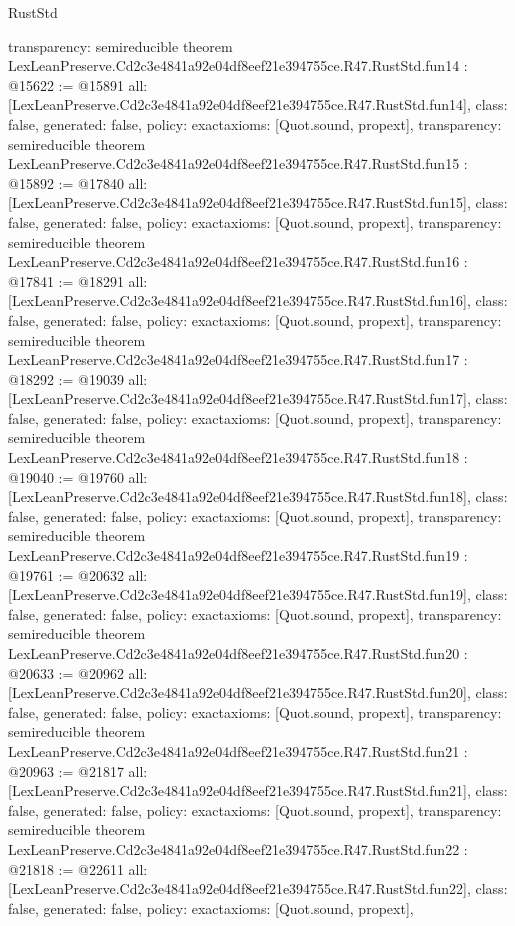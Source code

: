 \begin{lexlean}{RustStd}
\begin{coremodule}
{  transparency: semireducible
}
theorem LexLeanPreserve.Cd2c3e4841a92e04df8eef21e394755ce.R47.RustStd.fun14 : @15622 := @15891 {
  all: [LexLeanPreserve.Cd2c3e4841a92e04df8eef21e394755ce.R47.RustStd.fun14],
  class: false,
  generated: false,
  policy: exact{axioms: [Quot.sound, propext]},
  transparency: semireducible
}
theorem LexLeanPreserve.Cd2c3e4841a92e04df8eef21e394755ce.R47.RustStd.fun15 : @15892 := @17840 {
  all: [LexLeanPreserve.Cd2c3e4841a92e04df8eef21e394755ce.R47.RustStd.fun15],
  class: false,
  generated: false,
  policy: exact{axioms: [Quot.sound, propext]},
  transparency: semireducible
}
theorem LexLeanPreserve.Cd2c3e4841a92e04df8eef21e394755ce.R47.RustStd.fun16 : @17841 := @18291 {
  all: [LexLeanPreserve.Cd2c3e4841a92e04df8eef21e394755ce.R47.RustStd.fun16],
  class: false,
  generated: false,
  policy: exact{axioms: [Quot.sound, propext]},
  transparency: semireducible
}
theorem LexLeanPreserve.Cd2c3e4841a92e04df8eef21e394755ce.R47.RustStd.fun17 : @18292 := @19039 {
  all: [LexLeanPreserve.Cd2c3e4841a92e04df8eef21e394755ce.R47.RustStd.fun17],
  class: false,
  generated: false,
  policy: exact{axioms: [Quot.sound, propext]},
  transparency: semireducible
}
theorem LexLeanPreserve.Cd2c3e4841a92e04df8eef21e394755ce.R47.RustStd.fun18 : @19040 := @19760 {
  all: [LexLeanPreserve.Cd2c3e4841a92e04df8eef21e394755ce.R47.RustStd.fun18],
  class: false,
  generated: false,
  policy: exact{axioms: [Quot.sound, propext]},
  transparency: semireducible
}
theorem LexLeanPreserve.Cd2c3e4841a92e04df8eef21e394755ce.R47.RustStd.fun19 : @19761 := @20632 {
  all: [LexLeanPreserve.Cd2c3e4841a92e04df8eef21e394755ce.R47.RustStd.fun19],
  class: false,
  generated: false,
  policy: exact{axioms: [Quot.sound, propext]},
  transparency: semireducible
}
theorem LexLeanPreserve.Cd2c3e4841a92e04df8eef21e394755ce.R47.RustStd.fun20 : @20633 := @20962 {
  all: [LexLeanPreserve.Cd2c3e4841a92e04df8eef21e394755ce.R47.RustStd.fun20],
  class: false,
  generated: false,
  policy: exact{axioms: [Quot.sound, propext]},
  transparency: semireducible
}
theorem LexLeanPreserve.Cd2c3e4841a92e04df8eef21e394755ce.R47.RustStd.fun21 : @20963 := @21817 {
  all: [LexLeanPreserve.Cd2c3e4841a92e04df8eef21e394755ce.R47.RustStd.fun21],
  class: false,
  generated: false,
  policy: exact{axioms: [Quot.sound, propext]},
  transparency: semireducible
}
theorem LexLeanPreserve.Cd2c3e4841a92e04df8eef21e394755ce.R47.RustStd.fun22 : @21818 := @22611 {
  all: [LexLeanPreserve.Cd2c3e4841a92e04df8eef21e394755ce.R47.RustStd.fun22],
  class: false,
  generated: false,
  policy: exact{axioms: [Quot.sound, propext]},
}
\end{coremodule}
\end{lexlean}
